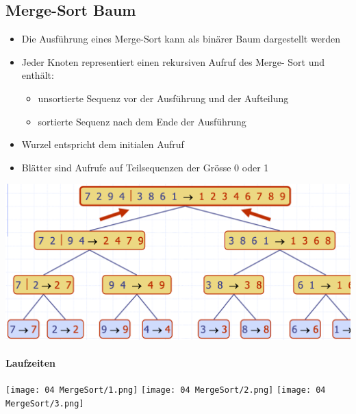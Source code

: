 \subsection{Merge-Sort Baum}
\begin{itemize}
    \item Die Ausführung eines Merge-Sort kann als binärer Baum dargestellt werden
    \item Jeder Knoten representiert einen rekursiven Aufruf des Merge- Sort und enthält:
    \begin{itemize}
        \item unsortierte Sequenz vor der Ausführung und der Aufteilung
        \item sortierte Sequenz nach dem Ende der Ausführung
    \end{itemize}
    \item Wurzel entspricht dem initialen Aufruf
    \item Blätter sind Aufrufe auf Teilsequenzen der Grösse 0 oder 1
\end{itemize}
\begin{center}
    \includegraphics[scale=.2]{graphic/04 MergeSort/merge sort.png}
\end{center}


\paragraph{Laufzeiten}
\begin{center}
    \texttt{[image: 04 MergeSort/1.png]}
    \texttt{[image: 04 MergeSort/2.png]}
    \texttt{[image: 04 MergeSort/3.png]}
\end{center}



\vfill


